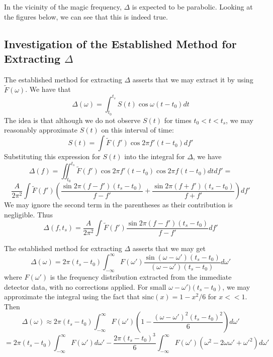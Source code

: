 \documentclass{article}
\begin{document}
In the vicinity of the magic frequency, $\Delta$ is expected to be parabolic. Looking at the figures below, we can see that this is indeed true.

\subsection{Investigation of the Established Method for Extracting $\Delta$}

The established method for extracting $\Delta$ asserts that we may extract it by using $\tilde{F}(\omega)$. We have that  \[\Delta(\omega)=\int^{t_s}_{t_0}S(t)\cos\omega(t-t_0)dt\] The idea is that although we do not observe $S(t)$ for times $t_0<t<t_s$, we may reasonably approximate $S(t)$ on this interval of time:\[S(t)=\int \tilde{F}(f')\cos2\pi f'(t-t_0)df'\] Substituting this expression for $S(t)$ into the integral for $\Delta$, we have \[\Delta(f)=\iint^{t_s}_{t_0}\tilde{F}(f')\cos2\pi f'(t-t_0)\cos2\pi f(t-t_0)dtdf'=\]\[\frac{A}{2\pi^2}\int \tilde{F}(f')\left(\frac{\sin2\pi(f-f')(t_s-t_0)}{f-f'}+\frac{\sin2\pi(f+f')(t_s-t_0)}{f+f'}\right)df'\] We may ignore the second term in the parentheses as their contribution is negligible. Thus \[\Delta(f,t_s)=\frac{A}{2\pi^2}\int \tilde{F}(f')\frac{\sin2\pi(f-f')(t_s-t_0)}{f-f'}df'\]


The established method for extracting $\Delta$ asserts that we may get \[\Delta(\omega)=2\pi(t_s-t_0)\int^{\infty}_{-\infty}F(\omega')\frac{\sin(\omega-\omega')(t_s-t_0)}{(\omega-\omega')(t_s-t_0)}d\omega'\] where $F(\omega')$ is the frequency distribution extracted from the immediate detector data, with no corrections applied. For small $\omega-\omega')(t_s-t_0)$, we may approximate the integral using the fact that $\text{sinc}(x)=1-x^2/6$ for $x<<1$. Then \[\Delta(\omega)\approx2\pi(t_s-t_0)\int^{\infty}_{-\infty}F(\omega')\left(1-\frac{(\omega-\omega')^2(t_s-t_0)^2}{6}\right)d\omega'\]\[=2\pi(t_s-t_0)\int^{\infty}_{-\infty}F(\omega')d\omega'-\frac{2\pi(t_s-t_0)^3}{6}\int^{\infty}_{-\infty}F(\omega')(\omega^2-2\omega\omega'+\omega'^2)d\omega'\]
\end{document}
